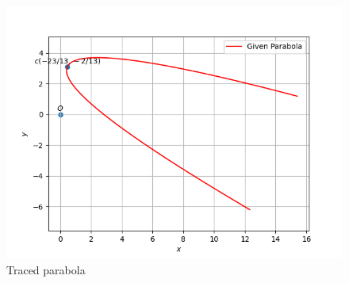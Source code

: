 \begin{enumerate}
\begin{figure}[!ht]
    \centering
    \includegraphics[width=\columnwidth]{./figs/parabola}
\caption{Traced parabola}
\label{parabola}
\end{figure}
\end{enumerate}





